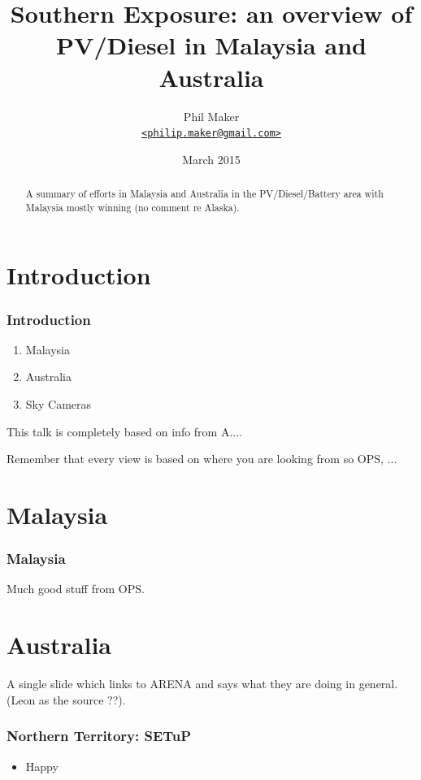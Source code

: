 \documentclass{beamer}
\title{Southern Exposure: an overview of PV/Diesel in Malaysia and
  Australia}
\author{Phil Maker\\
  \href{mailto:philip.maker@gmail.com}{\texttt{<philip.maker@gmail.com>}}
}
\institute{Alaskan Center for Energy and Power}
\date{March 2015}
\begin{document}
\begin{frame}
  \maketitle
  \vspace{-1.2cm}
  \begin{abstract}
    \small A summary of efforts in Malaysia and Australia in the
    PV/Diesel/Battery area with Malaysia mostly winning (no comment re
    Alaska).
  \end{abstract}
\end{frame}

\section{Introduction}
\begin{frame}\frametitle{Introduction}
  \begin{enumerate}
  \item Malaysia
  \item Australia
  \item Sky Cameras
  \end{enumerate}

This talk is completely based on info from A....

Remember that every view is based on where you are looking from
so OPS, ...

\end{frame}

\section{Malaysia}
\begin{frame}\frametitle{Malaysia}
Much good stuff from OPS.
\end{frame}

\section{Australia}
\begin{frame}
A single slide which links to ARENA and says what they are doing
in general. (Leon as the source ??).
\end{frame}

\begin{frame}\frametitle{Northern Territory: SETuP} 
  \begin{itemize}
  \item Happy
  \end{itemize}
\end{frame}
\end{document}
